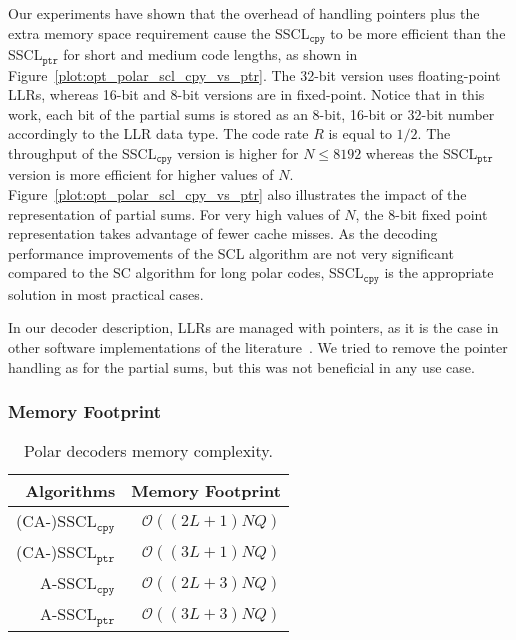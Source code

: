 Our experiments have shown that the overhead of handling pointers plus the
extra memory space requirement cause the SSCL$_{\texttt{cpy}}$ to be more
efficient than the SSCL$_{\texttt{ptr}}$ for short and medium code lengths, as
shown in Figure~\ref{plot:opt_polar_scl_cpy_vs_ptr}. The 32-bit version uses
floating-point LLRs, whereas 16-bit and 8-bit versions are in fixed-point.
Notice that in this work, each bit of the partial sums is stored as an 8-bit,
16-bit or 32-bit number accordingly to the LLR data type. The code rate $R$ is
equal to $1/2$. The throughput of the SSCL$_{\texttt{cpy}}$ version is higher
for $N \leq 8192$ whereas the SSCL$_{\texttt{ptr}}$ version is more efficient
for higher values of $N$. Figure~\ref{plot:opt_polar_scl_cpy_vs_ptr} also
illustrates the impact of the representation of partial sums. For very high
values of $N$, the 8-bit fixed point representation takes advantage of fewer
cache misses. As the decoding performance improvements of the SCL algorithm are
not very significant compared to the SC algorithm for long polar codes,
SSCL$_{\texttt{cpy}}$ is the appropriate solution in most practical cases.

In our decoder description, LLRs are managed with pointers, as it is the case in
other software implementations of the literature~\cite{Sarkis2014b,Sarkis2016,
Shen2016}. We tried to remove the pointer handling as for the partial sums, but
this was not beneficial in any use case.

\subsubsection{Memory Footprint}

\begin{table}[htp]
  \centering
  \caption{Polar decoders memory complexity.}
  \label{tab:opt_polar_scl_memory_footprint}
  \begin{tabular}{r r}
    \textbf{Algorithms}        & \textbf{Memory Footprint} \\
    \hline
    \hline
    (CA-)SSCL$_{\texttt{cpy}}$ & $\mathcal{O}((2L + 1)NQ)$ \\
    (CA-)SSCL$_{\texttt{ptr}}$ & $\mathcal{O}((3L + 1)NQ)$ \\
    A-SSCL$_{\texttt{cpy}}$    & $\mathcal{O}((2L + 3)NQ)$ \\
    A-SSCL$_{\texttt{ptr}}$    & $\mathcal{O}((3L + 3)NQ)$ \\
 \end{tabular}
\end{table}

